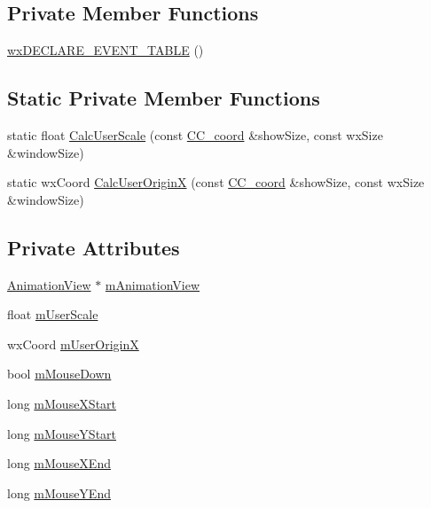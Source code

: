 \subsection*{Private Member Functions}
\begin{DoxyCompactItemize}
\item 
\hyperlink{a00011_ae41a34ccada4a27315448a1e8d3d81a0}{wx\-D\-E\-C\-L\-A\-R\-E\-\_\-\-E\-V\-E\-N\-T\-\_\-\-T\-A\-B\-L\-E} ()
\end{DoxyCompactItemize}
\subsection*{Static Private Member Functions}
\begin{DoxyCompactItemize}
\item 
static float \hyperlink{a00011_a1f96260bb91404a7cc56bdbc516490bf}{Calc\-User\-Scale} (const \hyperlink{a00029}{C\-C\-\_\-coord} \&show\-Size, const wx\-Size \&window\-Size)
\item 
static wx\-Coord \hyperlink{a00011_a14a79bb267db01c136370a1593fabe9c}{Calc\-User\-Origin\-X} (const \hyperlink{a00029}{C\-C\-\_\-coord} \&show\-Size, const wx\-Size \&window\-Size)
\end{DoxyCompactItemize}
\subsection*{Private Attributes}
\begin{DoxyCompactItemize}
\item 
\hyperlink{a00015}{Animation\-View} $\ast$ \hyperlink{a00011_ad942e2dec46489d2a7c2783d807dde50}{m\-Animation\-View}
\item 
float \hyperlink{a00011_ab2f7205a34a828219d20e19d5d035804}{m\-User\-Scale}
\item 
wx\-Coord \hyperlink{a00011_aab7e581755be241f33566dae39b7737f}{m\-User\-Origin\-X}
\item 
bool \hyperlink{a00011_ace603466b0a8ced6e3258a8657c56c4c}{m\-Mouse\-Down}
\item 
long \hyperlink{a00011_a1274fba3c24501db2e78c8304a05b5f4}{m\-Mouse\-X\-Start}
\item 
long \hyperlink{a00011_a21bb228cd51fecf39cae7064b5668486}{m\-Mouse\-Y\-Start}
\item 
long \hyperlink{a00011_abb8fdd6f6c448b6a9c899b1bded98808}{m\-Mouse\-X\-End}
\item 
long \hyperlink{a00011_a502c5a9601e4355fb7f6fc69c357ce83}{m\-Mouse\-Y\-End}
\end{DoxyCompactItemize}
